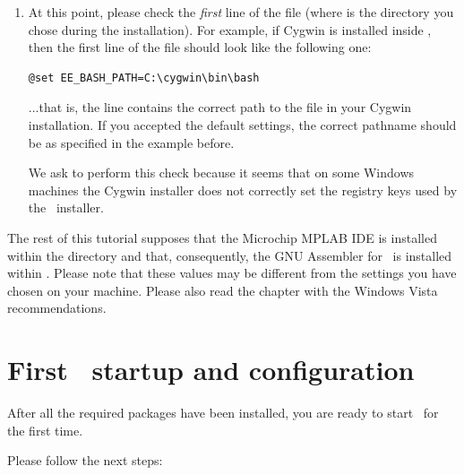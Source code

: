 \begin{enumerate}
\item At this point, please check the {\em first} line of the file
   (where 
  is the directory you chose during the installation). For example,
  if Cygwin is installed inside , then the first line
  of the file should look like the following one:
\begin{lstlisting}
@set EE_BASH_PATH=C:\cygwin\bin\bash
\end{lstlisting}
  ...that is, the line contains the correct path to the
   file in your Cygwin installation. If you accepted
  the default settings, the correct pathname should be
   as specified in the example before.
  \begin{note}
    We ask to perform this check because it seems that on some Windows
    machines the Cygwin installer does not correctly set the registry
    keys used by the \ee\ installer.
  \end{note}
\end{enumerate}

The rest of this tutorial supposes that the Microchip MPLAB IDE is
installed within the  directory and
that, consequently, the GNU Assembler for \dspic\ is installed within
. Please note
that these values may be different from the settings you have chosen
on your machine. Please also read the chapter with the Windows Vista
recommendations.

\chapter{First \rtd\ startup and configuration}

After all the required packages have been installed, you are ready to
start \rtd\ for the first time.

Please follow the next steps:

